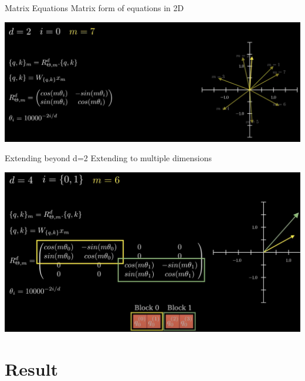 \documentclass{beamer}
\begin{document}
\begin{frame}[t]{Matrix Equations}
    Matrix form of equations in 2D
    \begin{center}
        \includegraphics[width=1.0\textwidth]{./img/rope_3.png}
    \end{center}
\end{frame}

\begin{frame}[t]{Extending beyond d=2}
    Extending to multiple dimensions
    \begin{center}
        \includegraphics[width=1.0\textwidth]{./img/rope_4.png}
    \end{center}
\end{frame}

\section{Result}
\end{document}
